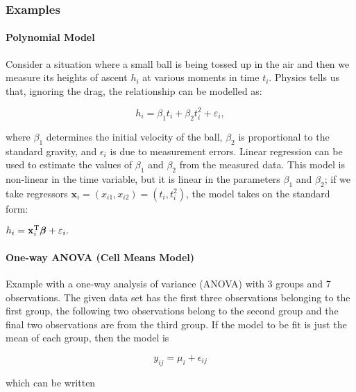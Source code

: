 \begin{itemize}
\end{itemize}

\subsubsection{Examples}

\paragraph{Polynomial Model}
Consider a situation where a small ball is being tossed up in the air and then we measure its heights of ascent $h_i$ at various moments in time $t_i$. Physics tells us that, ignoring the drag, the relationship can be modelled as:

\begin{equation}
 h_i = \beta_1 t_i + \beta_2 t_i^2 + \varepsilon_i,
\end{equation}

where $\beta_1$ determines the initial velocity of the ball, $\beta_2$ is proportional to the standard gravity, and $\epsilon_i$ is due to measurement errors. Linear regression can be used to estimate the values of $\beta_1$ and $\beta_2$ from the measured data. This model is non-linear in the time variable, but it is linear in the parameters $\beta_1$ and $\beta_2$; if we take regressors $\mathbf{x}_i = (x_{i1},x_{i2}) = (t_i,t_i^2)$, the model takes on the standard form:

 $h_i = \mathbf{x}^{\rm T}_i\boldsymbol\beta + \varepsilon_i.$



\paragraph{One-way ANOVA (Cell Means Model)}
Example with a one-way analysis of variance (ANOVA) with 3 groups and 7 observations. The given data set has the first three observations belonging to the first group, the following two observations belong to the second group and the final two observations are from the third group.
If the model to be fit is just the mean of each group, then the model is

\begin{equation}
  y_{ij} = \mu_i + \epsilon_{ij}
\end{equation}

which can be written

